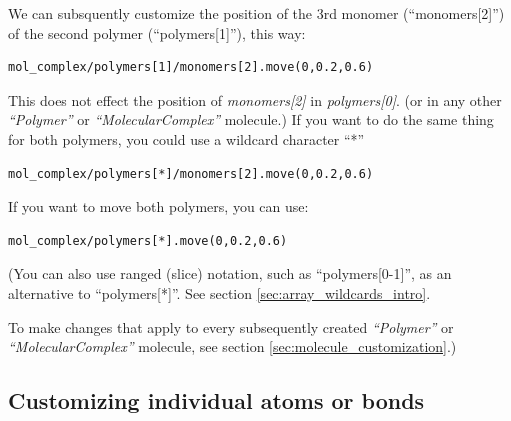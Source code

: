 \documentclass[11pt]{article}
\begin{document}
We can subsquently customize the position of the 3rd monomer (``monomers[2]'')
of the second polymer (``polymers[1]''), this way:
\begin{verbatim}
mol_complex/polymers[1]/monomers[2].move(0,0.2,0.6)
\end{verbatim}

This does not effect the position of
\textit{monomers[2]} in \textit{polymers[0]}.
(or in any other \textit{``Polymer''} or
\textit{``MolecularComplex''} molecule.)
If you want to do the same thing for both polymers,
you could use a wildcard character ``*''
\begin{verbatim}
mol_complex/polymers[*]/monomers[2].move(0,0.2,0.6)
\end{verbatim}
If you want to move both polymers, you can use:
\begin{verbatim}
mol_complex/polymers[*].move(0,0.2,0.6)
\end{verbatim}
(You can also use ranged (slice) notation, such as ``polymers[0-1]'',
 as an alternative to ``polymers[*]''. 
See section \ref{sec:array_wildcards_intro}.

To make changes that apply to every subsequently created \textit{``Polymer''}
or \textit{``MolecularComplex''} molecule,
see section \ref{sec:molecule_customization}.)


\subsection{Customizing individual atoms or bonds}
\end{document}
